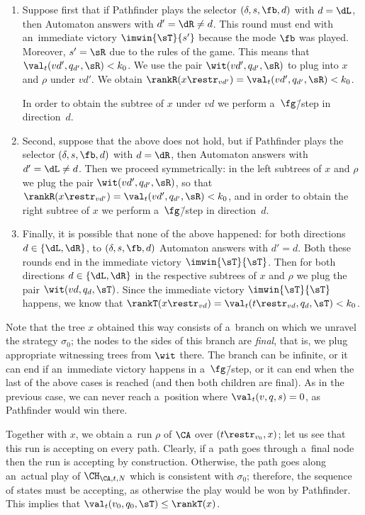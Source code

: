\begin{enumerate}
\item	Suppose first that if Pathfinder plays the selector $(\delta,s,\fb,d)$ with $d=\dL$, then Automaton answers with $d'=\dR\neq d$.
	This round must end with an~immediate victory $\imwin{\sT}{s'}$ because the mode $\fb$ was played.
	Moreover, $s'=\sR$ due to the rules of the game.
	This means that $\val_t(vd',q_{d'},\sR)<k_0$.
	We use the pair $\wit(vd',q_{d'},\sR)$ to plug into $x$ and $\rho$ under $vd'$.
	We obtain $\rankR(x\restr_{vd'})=\val_t(vd',q_{d'},\sR)<k_0$.

	In order to obtain the subtree of $x$ under $vd$ we perform a~$\fg$\=/step in direction~$d$.

\item	Second, suppose that the above does not hold, but if Pathfinder plays the selector $(\delta,s,\fb,d)$ with $d=\dR$, then Automaton answers with $d'=\dL\neq d$.
	Then we proceed symmetrically: in the left subtrees of $x$ and $\rho$ we plug the pair $\wit(vd',q_{d'},\sR)$, so that $\rankR(x\restr_{vd'})=\val_t(vd',q_{d'},\sR)<k_0$,
	and in order to obtain the right subtree of $x$ we perform a~$\fg$\=/step in direction~$d$.

\item	Finally, it is possible that none of the above happened: for both directions $d\in\{\dL,\dR\}$, to $(\delta,s,\fb,d)$ Automaton answers with $d'=d$.
	Both these rounds end in the immediate victory $\imwin{\sT}{\sT}$.
	Then for both directions $d\in\{\dL,\dR\}$ in the respective subtrees of $x$ and $\rho$ we plug the pair $\wit(vd,q_d,\sT)$.
	Since the immediate victory $\imwin{\sT}{\sT}$ happens, we know that $\rankT(x\restr_{vd})=\val_t(t\restr_{vd},q_d,\sT)< k_0$.
\end{enumerate}
\noindent %
Note that the tree $x$ obtained this way consists of a~branch on which we unravel the strategy $\sigma_0$;
the nodes to the sides of this branch are \emph{final}, that is, we plug appropriate witnessing trees from $\wit$ there.
The branch can be infinite, or it can end if an~immediate victory happens in a~$\fg$\=/step, or it can end when the last of the above cases is reached (and then both children are final).
As in the previous case, we can never reach a~position where $\val_t(v,q,s)=0$, as Pathfinder would win there.

Together with $x$, we obtain a~run $\rho$ of $\CA$ over $(t\restr_{v_0},x)$; let us see that this run is accepting on every path.
Clearly, if a~path goes through a~final node then the run is accepting by construction.
Otherwise, the path goes along an~actual play of $\CH_{\CA,t,N}$ which is consistent with $\sigma_0$;
therefore, the sequence of states must be accepting, as otherwise the play would be won by Pathfinder.
This implies that $\val_t(v_0,q_0,\sT)\leq\rankT(x)$.

